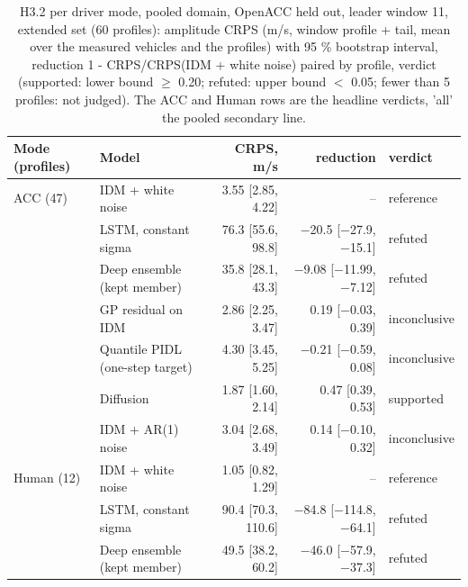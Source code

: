 \begin{table}[htbp]
\centering
\small
\caption{H3.2 per driver mode, pooled domain, OpenACC held out, leader window 11, extended set (60 profiles): amplitude CRPS (m/s, window profile + tail, mean over the measured vehicles and the profiles) with 95 \% bootstrap interval, reduction 1 - CRPS/CRPS(IDM + white noise) paired by profile, verdict (supported: lower bound $\geq$ 0.20; refuted: upper bound $<$ 0.05; fewer than 5 profiles: not judged). The ACC and Human rows are the headline verdicts, 'all' the pooled secondary line.}
\label{tab:t5-h32--e3--lodo-openacc-w11}
\begin{tabular}{llrrl}
\toprule
Mode (profiles) & Model & CRPS, m/s & reduction & verdict \\
\midrule
ACC (47) & IDM + white noise & 3.55 [2.85, 4.22] & -- & reference \\
 & LSTM, constant sigma & 76.3 [55.6, 98.8] & $-$20.5 [$-$27.9, $-$15.1] & refuted \\
 & Deep ensemble (kept member) & 35.8 [28.1, 43.3] & $-$9.08 [$-$11.99, $-$7.12] & refuted \\
 & GP residual on IDM & 2.86 [2.25, 3.47] & 0.19 [$-$0.03, 0.39] & inconclusive \\
 & Quantile PIDL (one-step target) & 4.30 [3.45, 5.25] & $-$0.21 [$-$0.59, 0.08] & inconclusive \\
 & Diffusion & 1.87 [1.60, 2.14] & 0.47 [0.39, 0.53] & supported \\
 & IDM + AR(1) noise & 3.04 [2.68, 3.49] & 0.14 [$-$0.10, 0.32] & inconclusive \\
\midrule
Human (12) & IDM + white noise & 1.05 [0.82, 1.29] & -- & reference \\
 & LSTM, constant sigma & 90.4 [70.3, 110.6] & $-$84.8 [$-$114.8, $-$64.1] & refuted \\
 & Deep ensemble (kept member) & 49.5 [38.2, 60.2] & $-$46.0 [$-$57.9, $-$37.3] & refuted \\

\end{tabular}
\end{table}
